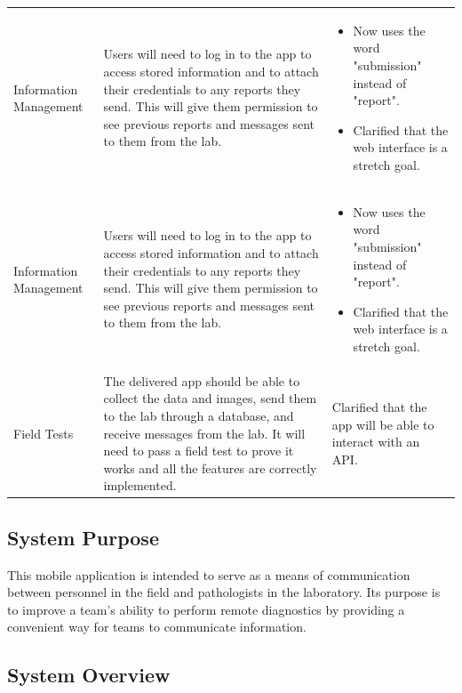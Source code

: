 \documentclass[onecolumn, draftclsnofoot,10pt, compsoc]{IEEEtran}
\begin{document}
\begin{table}
\begin{tabularx}{\textwidth}{|>{\setlength\hsize{.6\hsize}\setlength\linewidth{\hsize}}X|>{\setlength\hsize{1.6\hsize}\setlength\linewidth{\hsize}}X|>{\setlength\hsize{.8\hsize}\setlength\linewidth{\hsize}}X|}
\hline

Information Management
&
Users will need to log in to the app to access stored information and to attach their credentials to any reports they send. 
This will give them permission to see previous reports and messages sent to them from the lab. 
&
\begin{itemize}
    \item Now uses the word "submission" instead of "report".
    \item Clarified that the web interface is a stretch goal.
\end{itemize}\\%
Information Management
&
Users will need to log in to the app to access stored information and to attach their credentials to any reports they send. 
This will give them permission to see previous reports and messages sent to them from the lab. 
&
\begin{itemize}
    \item Now uses the word "submission" instead of "report".
    \item Clarified that the web interface is a stretch goal.
\end{itemize}\\

\hline

Field Tests
&
The delivered app should be able to collect the data and images, send them to the lab through a database, and receive messages from the lab. 
It will need to pass a field test to prove it works and all the features are correctly implemented.
&
Clarified that the app will be able to interact with an API.\\
 

\end{tabularx}
\end{table}

\subsection{System Purpose}
This mobile application is intended to serve as a means of communication between personnel in the field and pathologists in the laboratory. 
Its purpose is to improve a team's ability to perform remote diagnostics by providing a convenient way for teams to communicate information.

\subsection{System Overview}
\end{document}
